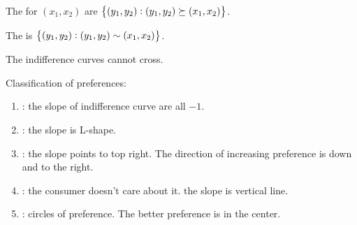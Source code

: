 The  for $(x_1,x_2)$ are $\set{(y_1,y_2): (y_1,y_2) \succeq (x_1,x_2)}$. 

The  is $\set{(y_1,y_2): (y_1,y_2) \sim (x_1,x_2)}$.

\begin{theorem}
    The indifference curves cannot cross.    
\end{theorem}

Classification of preferences:
\begin{enumerate}
    \item {}: the slope of indifference curve are all $-1$.
    \item {}: the slope is L-shape.
    \item {}: the slope points to top right. The direction of increasing preference is down and to the right.
    \item {}: the consumer doesn't care about it. the slope is vertical line.
    \item {}: circles of preference. The better preference is in the center.
\end{enumerate}

